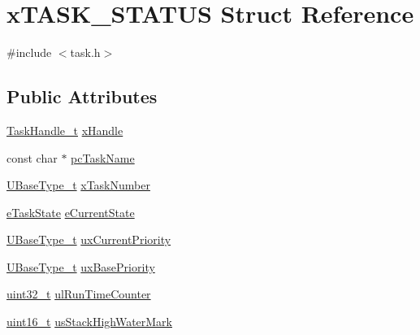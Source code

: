 \hypertarget{structx_t_a_s_k___s_t_a_t_u_s}{}\section{x\+T\+A\+S\+K\+\_\+\+S\+T\+A\+T\+US Struct Reference}
\label{structx_t_a_s_k___s_t_a_t_u_s}


{\ttfamily \#include $<$task.\+h$>$}

\subsection*{Public Attributes}
\begin{DoxyCompactItemize}
\item 
\hyperlink{task_8h_ae95f44d4cfeb4a599c6cc258d241cb6b}{Task\+Handle\+\_\+t} \hyperlink{structx_t_a_s_k___s_t_a_t_u_s_ac57f825f365c3c64bba827285fe3c2a0}{x\+Handle}
\item 
const char $\ast$ \hyperlink{structx_t_a_s_k___s_t_a_t_u_s_ad272663e2560bd9ea088384a39ba6192}{pc\+Task\+Name}
\item 
\hyperlink{_g_c_c_2_a_r_m___c_m3_2portmacro_8h_a646f89d4298e4f5afd522202b11cb2e6}{U\+Base\+Type\+\_\+t} \hyperlink{structx_t_a_s_k___s_t_a_t_u_s_acd44468ba37270b04f83d0833c098057}{x\+Task\+Number}
\item 
\hyperlink{task_8h_a1749369458e2282a22e862a619a3892c}{e\+Task\+State} \hyperlink{structx_t_a_s_k___s_t_a_t_u_s_a727e904e3afe49472b0fc6a4e96439cb}{e\+Current\+State}
\item 
\hyperlink{_g_c_c_2_a_r_m___c_m3_2portmacro_8h_a646f89d4298e4f5afd522202b11cb2e6}{U\+Base\+Type\+\_\+t} \hyperlink{structx_t_a_s_k___s_t_a_t_u_s_a39df647234fc0d6de5852042a2741a94}{ux\+Current\+Priority}
\item 
\hyperlink{_g_c_c_2_a_r_m___c_m3_2portmacro_8h_a646f89d4298e4f5afd522202b11cb2e6}{U\+Base\+Type\+\_\+t} \hyperlink{structx_t_a_s_k___s_t_a_t_u_s_a692f4c8957b7270f1579cdee63ff287e}{ux\+Base\+Priority}
\item 
\hyperlink{_p_e___types_8h_a33594304e786b158f3fb30289278f5af}{uint32\+\_\+t} \hyperlink{structx_t_a_s_k___s_t_a_t_u_s_a92ab83f4f376c255dedf8e06a78261f7}{ul\+Run\+Time\+Counter}
\item 
\hyperlink{_p_e___types_8h_a1f1825b69244eb3ad2c7165ddc99c956}{uint16\+\_\+t} \hyperlink{structx_t_a_s_k___s_t_a_t_u_s_a284892acd41bff7c319295687a95af6b}{us\+Stack\+High\+Water\+Mark}
\end{DoxyCompactItemize}


